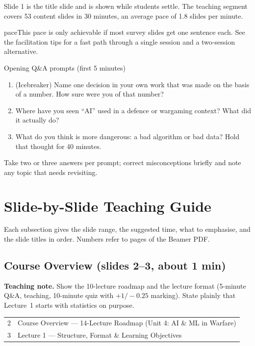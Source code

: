 \documentclass[11pt]{article}
\begin{document}
Slide 1 is the title slide and is shown while students settle. The teaching segment covers 53 content slides in 30 minutes, an average pace of 1.8 slides per minute. 

\begin{pitfall}{pace}This pace is only achievable if most survey slides get one sentence each. See the facilitation tips for a fast path through a single session and a two-session alternative.\end{pitfall}

\begin{instr}{Opening Q\&A prompts (first 5 minutes)}\begin{enumerate}\item (Icebreaker) Name one decision in your own work that was made on the basis of a number. How sure were you of that number?\item Where have you seen ``AI'' used in a defence or wargaming context? What did it actually do?\item What do you think is more dangerous: a bad algorithm or bad data? Hold that thought for 40 minutes.\end{enumerate}Take two or three answers per prompt; correct misconceptions briefly and note any topic that needs revisiting.\end{instr}

\section{Slide-by-Slide Teaching Guide}

Each subsection gives the slide range, the suggested time, what to emphasise, and the slide titles in order. Numbers refer to pages of the Beamer PDF.

\subsection{Course Overview \normalfont\small\color{GreyN}(slides 2--3, about 1 min)}

\textbf{Teaching note.} Show the 10-lecture roadmap and the lecture format (5-minute Q\&A, teaching, 10-minute quiz with $+1/-0.25$ marking). State plainly that Lecture~1 starts with statistics on purpose.

\begin{center}\small\renewcommand{\arraystretch}{1.1}\begin{tabularx}{\textwidth}{@{}r X@{}}2 & Course Overview --- 14-Lecture Roadmap (Unit 4: AI \& ML in Warfare)\\
3 & Lecture 1 --- Structure, Format \& Learning Objectives\\\end{tabularx}\end{center}
\end{document}
